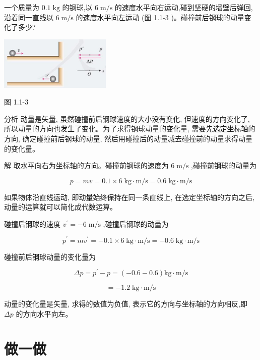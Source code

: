 \documentclass[10pt]{article}
\begin{document}
一个质量为 \({0.1}\mathrm{\;{kg}}\) 的钢球,以 \(6\mathrm{\;m}/\mathrm{s}\) 的速度水平向右运动,碰到坚硬的墙壁后弹回,沿着同一直线以 \(6\mathrm{\;m}/\mathrm{s}\) 的速度水平向左运动 (图 1.1-3 )。碰撞前后钢球的动量变化了多少?

\begin{center}
\includegraphics[max width=0.4\textwidth]{images/01910e4c-ebb8-7d2c-8f2f-2375bc1d2d12_9_697683.jpg}
\end{center}

图 1.1-3

分析 动量是矢量, 虽然碰撞前后钢球速度的大小没有变化, 但速度的方向变化了, 所以动量的方向也发生了变化。为了求得钢球动量的变化量, 需要先选定坐标轴的方向, 确定碰撞前后钢球的动量, 然后用碰撞后的动量减去碰撞前的动量求得动量的变化量。

解 取水平向右为坐标轴的方向。碰撞前钢球的速度为 \(6\mathrm{\;m}/\mathrm{s}\) ,碰撞前钢球的动量为

\[
p = {mv} = {0.1} \times 6\mathrm{\;{kg}} \cdot \mathrm{m}/\mathrm{s} = {0.6}\mathrm{\;{kg}} \cdot \mathrm{m}/\mathrm{s}
\]

\begin{mdframed}

如果物体沿直线运动, 即动量始终保持在同一条直线上, 在选定坐标轴的方向之后, 动量的运算就可以简化成代数运算。

\end{mdframed}

碰撞后钢球的速度 \({v}^{\prime } = - 6\mathrm{\;m}/\mathrm{s}\) ,碰撞后钢球的动量为

\[
{p}^{\prime } = m{v}^{\prime } = - {0.1} \times 6\mathrm{\;{kg}} \cdot \mathrm{m}/\mathrm{s} = - {0.6}\mathrm{\;{kg}} \cdot \mathrm{m}/\mathrm{s}
\]

碰撞前后钢球动量的变化量为

\[
{\Delta p} = {p}^{\prime } - p = \left( {-{0.6} - {0.6}}\right) \mathrm{{kg}} \cdot \mathrm{m}/\mathrm{s}
\]

\[
= - {1.2}\mathrm{\;{kg}} \cdot \mathrm{m}/\mathrm{s}
\]

动量的变化量是矢量, 求得的数值为负值, 表示它的方向与坐标轴的方向相反,即 \({\Delta p}\) 的方向水平向左。

\section*{做一做}
\end{document}
